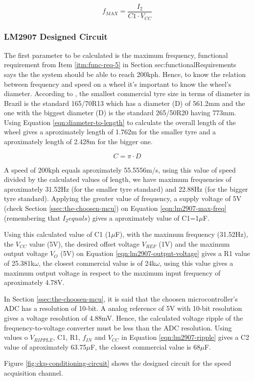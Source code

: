 			\begin{equation}\label{eqn:lm2907-max-freq}
				f_{MAX} = \frac{I_{2}}{C1 \cdot V_{CC}}
			\end{equation}

		\subsubsection{LM2907 Designed Circuit}\label{sssec:lm2907-designed-circuit}

			The first parameter to be calculated is the maximum frequency, functional requirement from Item \ref{itm:func-req-5} in Section {sec:functionalRequirements} says the the system should be able to reach 200kph. Hence, to know the relation between frequency and speed on a wheel it's important to know the wheel's diameter. According to \cite{pneus-facil-todas-as-medidas-de-pneu}, the smallest commercial tyre size in terms of diameter in Brazil is the standard 165/70R13 which has a diameter (D) of 561.2mm and the one with the biggest diameter (D) is the standard 265/50R20 having 773mm. Using Equation \ref{eqn:diameter-to-length} to calculate the overall length of the wheel gives a aproximately length of 1.762m for the smaller tyre and a aproximately length of 2.428m for the bigger one.

			\begin{equation}\label{eqn:diameter-to-length}
				C = \pi \cdot D
			\end{equation}

			A speed of 200kph equals aproximately 55.5556m/s, using this value of speed divided by the calculated values of length, we have maximum frequencies of aproximately 31.52Hz (for the smaller tyre standard) and 22.88Hz (for the bigger tyre standard). Applying the greater value of frequency, a supply voltage of 5V (check Section \ref{ssec:the-choosen-mcu}) on Equation \ref{eqn:lm2907-max-freq} (remembering that $I_{2} equals$) gives a aproximately value of C1=1$\mu$F.
			\par
			Using this calculated value of C1 (1$\mu$F), with the maximum frequency (31.52Hz), the $V_{CC}$ value (5V), the desired offset voltage $V_{REF}$ (1V) and the maximum output voltage $V_{O}$ (5V) on Equation \ref{eqn:lm2907-output-voltage} gives a R1 value of 25.381k$\omega$, the closest commercial value is of 24k$\omega$, using this value gives a maximum output voltage in respect to the maximum input frequency of aproximately 4.78V.
			\par
			In Section \ref{ssec:the-choosen-mcu}, it is said that the choosen microcontroller's ADC has a resolution of 10-bit. A analog reference of 5V with 10-bit resolution gives a voltage resolution of 4.88mV. Hence, the calculated voltage ripple of the frequency-to-voltage converter must be less than the ADC resolution. Using values o $V_{RIPPLE}$, C1, R1, $f_{IN}$ and $V_{CC}$ in Equation \ref{eqn:lm2907-ripple} gives a C2 value of aproximately 63.75$\mu$F, the closest commercial value is 68$\mu$F.
			\par
			Figure \ref{fig:ckp-conditioning-circuit} shows the designed circuit for the speed acquisition channel.

